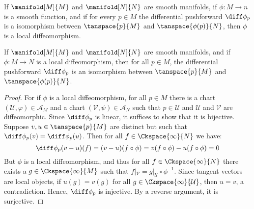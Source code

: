         \begin{theorem}
            If $\manifold[M]{M}$ and $\manifold[N]{N}$ are smooth manifolds,
            if $\phi:M\rightarrow{n}$ is a smooth function, and if
            for every $p\in{M}$ the differential pushforward
            $\diff\phi_{p}$ is a isomorphism between $\tanspace{p}{M}$ and
            $\tanspace{\phi(p)}{N}$, then $\phi$ is a local diffeomorphism.
        \end{theorem}
        \begin{theorem}
            If $\manifold[M]{M}$ and $\manifold[N]{N}$ are smooth manifolds,
            and if $\phi:M\rightarrow{N}$ is a local diffeomorphism, then
            for all $p\in{M}$, the differential pushforward $\diff\phi_{p}$
            is an isomorphism between $\tanspace{p}{M}$ and
            $\tanspace{\phi(p)}{N}$.
        \end{theorem}
        \begin{proof}
            For if $\phi$ is a local diffeomorphism, for all $p\in{M}$ there
            is a chart $(\mathcal{U},\varphi)\in\mathcal{A}_{M}$ and a
            chart $(\mathcal{V},\psi)\in\mathcal{A}_{N}$ such that
            $p\in\mathcal{U}$ and $\mathcal{U}$ and $\mathcal{V}$ are
            diffeomorphic. Since $\diff\phi_{p}$ is linear, it suffices to
            show that it is bijective. Suppose $v,u\in\tanspace{p}{M}$ are
            distinct but such that $\diff\phi_{p}(v)=\diff\phi_{p}(u)$.
            Then for all $f\in\Ckspace{\infty}{N}$ we have:
            \begin{equation}
                \diff\phi_{p}(v-u)(f)=(v-u)(f\circ\phi)
                =v(f\circ\phi)-u(f\circ\phi)=0
            \end{equation}
            But $\phi$ is a local diffeomorphism, and thus for all
            $f\in\Ckspace{\infty}{N}$ there exists a
            $g\in\Ckspace{\infty}{M}$ such that
            $f|_{\mathcal{V}}=g|_{\mathcal{U}}\circ\phi^{\minus{1}}$. Since
            tangent vectors are local objects, if $u(g)=v(g)$ for all
            $g\in\Ckspace{\infty}{\mathcal{U}}$, then $u=v$, a
            contradiction. Hence, $\diff\phi_{p}$ is injective. By a reverse
            argument, it is surjective.
        \end{proof}
